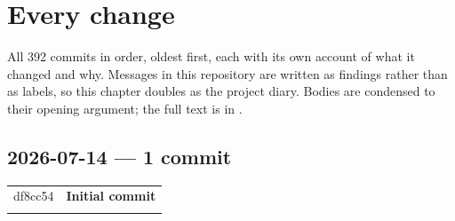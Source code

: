 \chapter{Every change}\label{ch:changes}
All 392 commits in order, oldest first, each with its own account of what it changed and why. Messages in this repository are written as findings rather than as labels, so this chapter doubles as the project diary. Bodies are condensed to their opening argument; the full text is in .

\section*{2026-07-14 \textnormal{\small\textcolor{srlgrey}{--- 1 commit}}}
\begin{longtable}{@{}p{}p{}@{}}
\endfirsthead\endhead
{\scriptsize\ttfamily df8cc54} & \textbf{Initial commit} \\
\addlinespace[3pt]
\end{longtable}

